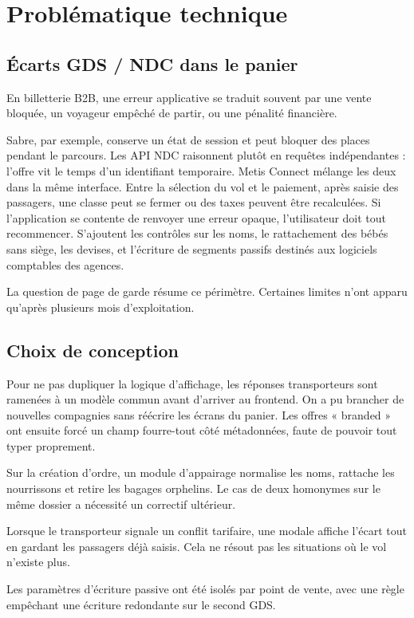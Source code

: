 \chapter{Problématique technique}
\label{chap:problematique}

\section{Écarts GDS / NDC dans le panier}

En billetterie B2B, une erreur applicative se traduit souvent par une vente bloquée, un voyageur empêché de partir, ou une pénalité financière.

Sabre, par exemple, conserve un état de session et peut bloquer des places pendant le parcours. Les API NDC raisonnent plutôt en requêtes indépendantes : l'offre vit le temps d'un identifiant temporaire. Metis Connect mélange les deux dans la même interface. Entre la sélection du vol et le paiement, après saisie des passagers, une classe peut se fermer ou des taxes peuvent être recalculées. Si l'application se contente de renvoyer une erreur opaque, l'utilisateur doit tout recommencer. S'ajoutent les contrôles sur les noms, le rattachement des bébés sans siège, les devises, et l'écriture de segments passifs destinés aux logiciels comptables des agences.

La question de page de garde résume ce périmètre. Certaines limites n'ont apparu qu'après plusieurs mois d'exploitation.

\section{Choix de conception}

Pour ne pas dupliquer la logique d'affichage, les réponses transporteurs sont ramenées à un modèle commun avant d'arriver au frontend. On a pu brancher de nouvelles compagnies sans réécrire les écrans du panier. Les offres « branded » ont ensuite forcé un champ fourre-tout côté métadonnées, faute de pouvoir tout typer proprement.

Sur la création d'ordre, un module d'appairage normalise les noms, rattache les nourrissons et retire les bagages orphelins. Le cas de deux homonymes sur le même dossier a nécessité un correctif ultérieur.

Lorsque le transporteur signale un conflit tarifaire, une modale affiche l'écart tout en gardant les passagers déjà saisis. Cela ne résout pas les situations où le vol n'existe plus.

Les paramètres d'écriture passive ont été isolés par point de vente, avec une règle empêchant une écriture redondante sur le second GDS.

